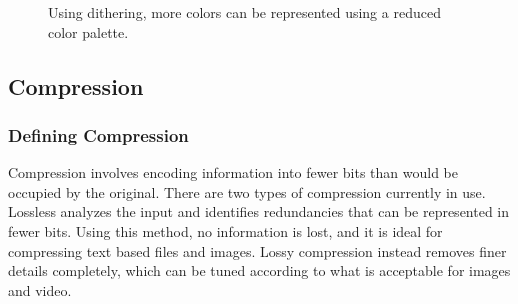 \documentclass[12pt]{article}
\begin{document}
\begin{figure}[!htbp]
\begin{center}
\caption{Using dithering, more colors can be represented using a reduced color palette.}
\end{center}
\end{figure}


\subsection{Compression}

\subsubsection{Defining Compression}
Compression involves encoding information into fewer bits than would be occupied by the original. There are two types of compression currently in use. Lossless analyzes the input and identifies redundancies that can be represented in fewer bits. Using this method, no information is lost, and it is ideal for compressing text based files and images. Lossy compression instead removes finer details completely, which can be tuned according to what is acceptable for images and video.
\end{document}
